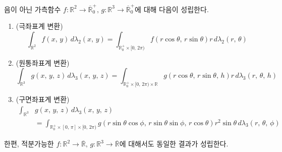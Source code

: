 \begin{corollary}
    음이 아닌 가측함수 $f:\mathbb{R}^2\to\overline{\mathbb{R}}^+_0,\,g:\mathbb{R}^3\to\overline{\mathbb{R}}^+_0$에 대해 다음이 성립한다.
    \begin{enumerate}
        \item (극좌표계 변환)
        \begin{equation*}
            \int_{\mathbb{R}^2}f(x,\,y)\,d\lambda_2(x,\,y)=\int_{\mathbb{R}^+_0\times[0,\,2\pi)}f(r\cos\theta,\,r\sin\theta)r\,d\lambda_2(r,\,\theta)
        \end{equation*}
        \item (원통좌표계 변환)
        \begin{equation*}
            \int_{\mathbb{R}^3}g(x,\,y,\,z)\,d\lambda_3(x,\,y,\,z)=\int_{\mathbb{R}^+_0\times[0,\,2\pi)\times\mathbb{R}}g(r\cos\theta,\,r\sin\theta,\,h)r\,d\lambda_3(r,\,\theta,\,h)
        \end{equation*}
        \item (구면좌표계 변환)
        \begin{align*}
            \int_{\mathbb{R}^3}&g(x,\,y,\,z)\,d\lambda_3(x,\,y,\,z)\\
            &=\int_{\mathbb{R}^+_0\times[0,\,\pi]\times[0,\,2\pi)}g(r\sin\theta\cos\phi,\,r\sin\theta\sin\phi,\,r\cos\theta)r^2\sin\theta\,d\lambda_3(r,\,\theta,\,\phi)
        \end{align*}
    \end{enumerate}
    한편, 적분가능한 $f:\mathbb{R}^2\to\overline{\mathbb{R}},\,g:\mathbb{R}^3\to\overline{\mathbb{R}}$에 대해서도 동일한 결과가 성립한다.
\end{corollary}

